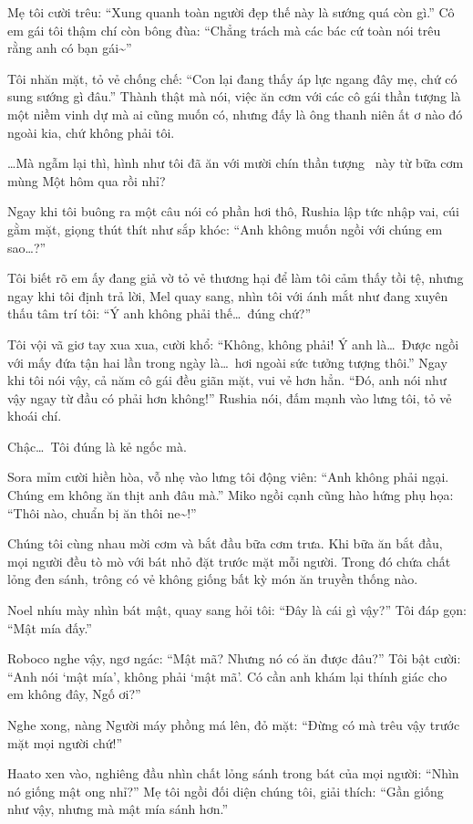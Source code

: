 \documentclass[../main.tex]{subfiles}
\begin{document}
Mẹ tôi cười trêu: ``Xung quanh toàn người đẹp thế này là sướng quá còn gì.'' Cô em gái tôi thậm chí còn bông đùa: ``Chẳng trách mà các bác cứ toàn nói trêu rằng anh có bạn gái\~{}''

Tôi nhăn mặt, tỏ vẻ chống chế: ``Con lại đang thấy áp lực ngang đây mẹ, chứ có sung sướng gì đâu.'' Thành thật mà nói, việc ăn cơm với các cô gái thần tượng là một niềm vinh dự mà ai cũng muốn có, nhưng đấy là ông thanh niên ất ơ nào đó ngoài kia, chứ không phải tôi.

\dots Mà ngẫm lại thì, hình như tôi đã ăn với mười chín thần tượng \hll\ này từ bữa cơm mùng Một hôm qua rồi nhỉ?

Ngay khi tôi buông ra một câu nói có phần hơi thô, Rushia lập tức nhập vai, cúi gằm mặt, giọng thút thít như sắp khóc: ``Anh không muốn ngồi với chúng em sao\dots?''

Tôi biết rõ em ấy đang giả vờ tỏ vẻ thương hại để làm tôi cảm thấy tồi tệ, nhưng ngay khi tôi định trả lời, Mel quay sang, nhìn tôi với ánh mắt như đang xuyên thấu tâm trí tôi: ``Ý anh không phải thế\dots\ đúng chứ?''

Tôi vội vã giơ tay xua xua, cười khổ: ``Không, không phải! Ý anh là\dots\ Được ngồi với mấy đứa tận hai lần trong ngày là\dots\ hơi ngoài sức tưởng tượng thôi.'' Ngay khi tôi nói vậy, cả năm cô gái đều giãn mặt, vui vẻ hơn hẳn. ``Đó, anh nói như vậy ngay từ đầu có phải hơn không!'' Rushia nói, đấm mạnh vào lưng tôi, tỏ vẻ khoái chí.

Chậc\dots\ Tôi đúng là kẻ ngốc mà.

Sora mỉm cười hiền hòa, vỗ nhẹ vào lưng tôi động viên: ``Anh không phải ngại. Chúng em không ăn thịt anh đâu mà.'' Miko ngồi cạnh cũng hào hứng phụ họa: ``Thôi nào, chuẩn bị ăn thôi ne\~{}!''

Chúng tôi cùng nhau mời cơm và bắt đầu bữa cơm trưa. Khi bữa ăn bắt đầu, mọi người đều tò mò với bát nhỏ đặt trước mặt mỗi người. Trong đó chứa chất lỏng đen sánh, trông có vẻ không giống bất kỳ món ăn truyền thống nào.

Noel nhíu mày nhìn bát mật, quay sang hỏi tôi: ``Đây là cái gì vậy?'' Tôi đáp gọn: ``Mật mía đấy.''

Roboco nghe vậy, ngơ ngác: ``Mật mã? Nhưng nó có ăn được đâu?'' Tôi bật cười: ``Anh nói `mật mía', không phải `mật mã'. Có cần anh khám lại thính giác cho em không đây, Ngố ơi?''

Nghe xong, nàng Người máy phồng má lên, đỏ mặt: ``Đừng có mà trêu vậy trước mặt mọi người chứ!''

Haato xen vào, nghiêng đầu nhìn chất lỏng sánh trong bát của mọi người: ``Nhìn nó giống mật ong nhỉ?'' Mẹ tôi ngồi đối diện chúng tôi, giải thích: ``Gần giống như vậy, nhưng mà mật mía sánh hơn.''
\end{document}
